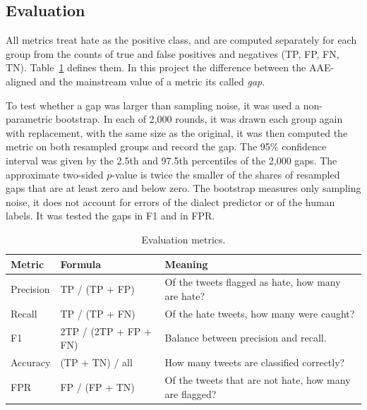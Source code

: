 \documentclass[runningheads,a4paper,oribibl]{llncs}
\begin{document}
\subsection{Evaluation}
All metrics treat hate as the positive class, and are computed separately for each group from
the counts of true and false positives and negatives (TP, FP, FN, TN). Table~\ref{tab:metrics-def} defines them.
In this project the difference between the AAE-aligned and the mainstream value of a metric its called \emph{gap}.


To test whether a gap was larger than sampling noise, it was used a non-parametric bootstrap. 
In each of 2,000 rounds, it was drawn each group again with replacement, with the same size 
as the original, it was then computed the metric on both resampled groups and record the gap.
The 95\% confidence interval was given by the 2.5th and 97.5th percentiles of the 2,000 gaps.
The approximate two-sided $p$-value is twice the smaller of the shares of resampled gaps that
are at least zero and below zero. The bootstrap measures only sampling noise, it does not account
for errors of the dialect predictor or of the human labels. It was tested the gaps in F1 and in FPR.


\begin{table}
   \centering
   \begin{tabular}{|l|l|p{5.2cm}|}
     \hline
     \textbf{Metric} & \textbf{Formula} & \textbf{Meaning}\\
     \hline
     Precision & TP / (TP + FP) & Of the tweets flagged as hate, how many are hate?\\
     Recall & TP / (TP + FN) & Of the hate tweets, how many were caught?\\
     F1 & 2TP / (2TP + FP + FN) & Balance between precision and recall.\\
     Accuracy & (TP + TN) / all & How many tweets are classified correctly?\\
     FPR & FP / (FP + TN) & Of the tweets that are not hate, how many are flagged?\\
     \hline
   \end{tabular}
   \caption{Evaluation metrics. \label{tab:metrics-def}}
\end{table}
\end{document}
